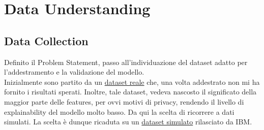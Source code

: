 \documentclass[]{article}
\begin{document}
\section{Data Understanding}
    \subsection{Data Collection}
        Definito il Problem Statement, passo all'individuazione del dataset adatto per l'addestramento e la validazione del modello.\\
        Inizialmente sono partito da un \href{https://www.kaggle.com/datasets/mlg-ulb/creditcardfraud}{dataset reale} che, una volta addestrato non mi ha fornito i risultati sperati. Inoltre, tale dataset, vedeva nascosto il significato della maggior parte delle features, per ovvi motivi di privacy, rendendo il livello di explainability del modello molto basso. Da qui la scelta di ricorrere a dati simulati.
        La scelta è dunque ricaduta su un \href{https://www.kaggle.com/datasets/ealtman2019/credit-card-transactions/data}{dataset simulato} rilasciato da IBM.
\end{document}
